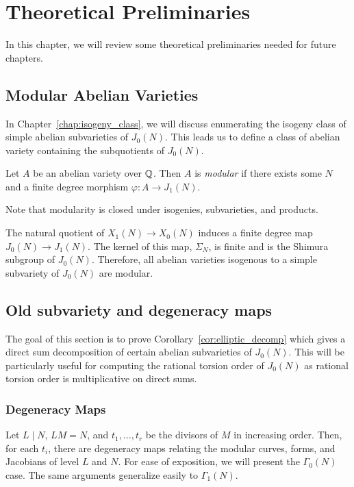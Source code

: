 \chapter{Theoretical Preliminaries}%
\label{chap:prelim}

In this chapter, we will review some theoretical preliminaries needed for
future chapters. 

\section{Modular Abelian Varieties}

In Chapter~\ref{chap:isogeny_class}, we will discuss enumerating the isogeny
class of simple abelian subvarieties of $J_0(N)$. This leads us to define a
class of abelian variety containing the subquotients of $J_0(N)$.

\begin{definition}
    \label{defn:modabvar}
    Let $A$ be an abelian variety over $\mathbb{Q}$. Then $A$ is \emph{modular} if
    there exists some $N$ and a finite degree morphism $\varphi:A\to J_1(N)$.

    Note that modularity is closed under isogenies, subvarieties, and products.
\end{definition}

The natural quotient of $X_1(N)\to X_0(N)$ induces a finite degree map
$J_0(N)\to J_1(N)$. The kernel of this map, $\Sigma_N$, is finite and is the
Shimura subgroup of $J_0(N)$. Therefore, all abelian varieties isogenous to a
simple subvariety of $J_0(N)$ are modular.

\section{Old subvariety and degeneracy maps}

The goal of this section is to prove Corollary~\ref{cor:elliptic_decomp} which
gives a direct sum decomposition of certain abelian subvarieties of $J_0(N)$.
This will be particularly useful for computing the rational torsion order of
$J_0(N)$ as rational torsion order is multiplicative on direct sums.

\subsection{Degeneracy Maps}%
\label{sub:degeneracy_maps}

Let $L\mid N$, $LM=N$, and $t_1,\ldots,t_r$ be the divisors of $M$ in
increasing order. Then, for each $t_i$, there are degeneracy maps relating the
modular curves, forms, and Jacobians of level $L$ and $N$. For ease of
exposition, we will present the $\Gamma_0(N)$ case. The same arguments
generalize easily to $\Gamma_1(N)$.

